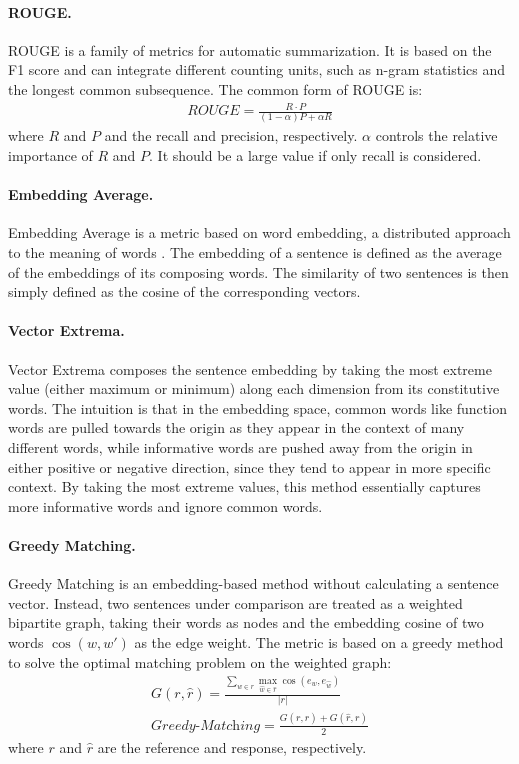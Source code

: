 \documentclass[runningheads]{llncs}
\begin{document}
    \paragraph{ROUGE.}
    ROUGE \cite{ROUGE} is a family of metrics for automatic summarization. It is based on the F1 score and can integrate different counting units, such as n-gram statistics and the longest common subsequence. The common form of ROUGE is:
    \begin{align}
        \textit{ROUGE} = \frac{
        R \cdot P
        }{(1 - \alpha) P + \alpha R}
    \end{align}
    where $R$ and $P$ and the recall and precision, respectively. $\alpha$ controls the relative importance of $R$ and $P$. It should be a large value if only recall is considered.

    \paragraph{Embedding Average.}
    Embedding Average is a metric based on word embedding, a distributed approach to the meaning of words \cite{word2vec}. The embedding of a sentence is defined as the average of the embeddings of its composing words. The similarity of two sentences is then simply defined as the cosine of the corresponding vectors.

    \paragraph{Vector Extrema.}
    Vector Extrema \cite{Vector_Extrema} composes the sentence embedding by taking the most extreme value (either maximum or minimum) along each dimension from its constitutive words. The intuition is that in the embedding space, common words like function words are pulled towards the origin as they appear in the context of many different words, while informative words are pushed away from the origin in either positive or negative direction, since they tend to appear in more specific context. By taking the most extreme values, this method essentially captures more informative words and ignore common words.

    \paragraph{Greedy Matching.}
    Greedy Matching \cite{GreedyAndOptimal} is an embedding-based method without calculating a sentence vector. Instead, two sentences under comparison are treated as a weighted bipartite graph, taking their words as nodes and the embedding cosine of two words $\cos(w, w')$ as the edge weight. The metric is based on a greedy method to solve the optimal matching problem on the weighted graph:
    \begin{align}
        G(r, \hat{r}) = \frac{
        \sum_{w \in r} \max_{\hat{w} \in \hat{r}} \cos(e_w, e_{\hat{w}})
        }{ |r| } \\
        \textit{Greedy-Matching} = \frac{
        G(r, \hat{r}) + G(\hat{r}, r)
        }{2}
    \end{align}
    where $r$ and $\hat{r}$ are the reference and response, respectively.
\end{document}
